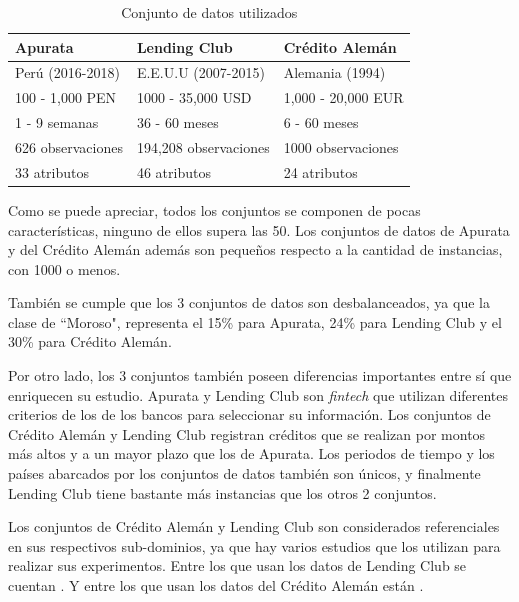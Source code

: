 \begin{table}
	\centering
	\caption{Conjunto de datos utilizados}
	\label{tab:dataset-comparison}
	\begin{tabular}{@{}lll@{}}
	\toprule
	\textbf{Apurata}	& \textbf{Lending Club}		& \textbf{Crédito Alemán}	\\
	\midrule
	Perú (2016-2018)	& E.E.U.U (2007-2015)		& Alemania (1994)			\\
	100 - 1,000 PEN		& 1000 - 35,000 USD			& 1,000 - 20,000 EUR		\\
	1 - 9 semanas		& 36 - 60 meses				& 6 - 60 meses				\\
	626 observaciones	& 194,208 observaciones		& 1000 observaciones		\\
	33 atributos		& 46 atributos				& 24 atributos				\\
	\bottomrule
	\end{tabular}
\end{table}

Como se puede apreciar, todos los conjuntos se componen de pocas características, ninguno de ellos supera las 50. Los conjuntos de datos de Apurata y del Crédito Alemán además son pequeños respecto a la cantidad de instancias, con 1000 o menos.

También se cumple que los 3 conjuntos de datos son desbalanceados, ya que la clase de ``Moroso", representa el 15\% para Apurata, 24\% para Lending Club y el 30\% para Crédito Alemán.

Por otro lado, los 3 conjuntos también poseen diferencias importantes entre sí que enriquecen su estudio. Apurata y Lending Club son \textit{fintech} que utilizan diferentes criterios de los de los bancos para seleccionar su información. Los conjuntos de Crédito Alemán y Lending Club registran créditos que se realizan por montos más altos y a un mayor plazo que los de Apurata. Los periodos de tiempo y los países abarcados por los conjuntos de datos también son únicos, y finalmente Lending Club tiene bastante más instancias que los otros 2 conjuntos.

Los conjuntos de Crédito Alemán y Lending Club son considerados referenciales en sus respectivos sub-dominios, ya que hay varios estudios que los utilizan para realizar sus experimentos. Entre los que usan los datos de Lending Club se cuentan \citep{malekipirbazari2015risk, zhang2016research, zang2014credit, tan2018deep}. Y entre los que usan los datos del Crédito Alemán están \citep{harris2015credit, nanni2009experimental, brown2012experimental, wang2012two}.

